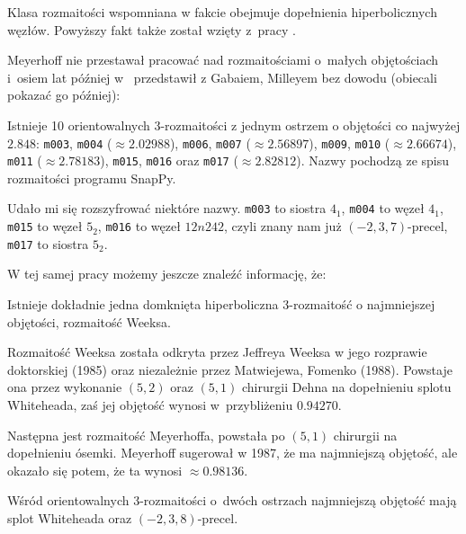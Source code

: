 Klasa rozmaitości wspomniana w fakcie obejmuje dopełnienia hiperbolicznych węzłów.
Powyższy fakt także został wzięty z~pracy \cite{cao01}.

Meyerhoff nie przestawał pracować nad rozmaitościami o~małych objętościach i~osiem lat później w~\cite{meyerhoff09} przedstawił z Gabaiem, Milleyem bez dowodu (obiecali pokazać go później):

\begin{proposition}
    Istnieje 10 orientowalnych 3-rozmaitości z jednym ostrzem o objętości co najwyżej $2.848$: \texttt{m003}, \texttt{m004} ($\approx 2.02988$), \texttt{m006}, \texttt{m007} ($\approx 2.56897$), \texttt{m009}, \texttt{m010} ($\approx 2.66674$), \texttt{m011} ($\approx 2.78183$), \texttt{m015}, \texttt{m016} oraz \texttt{m017} ($\approx 2.82812$).
    Nazwy pochodzą ze spisu rozmaitości programu SnapPy.
\end{proposition}

Udało mi się rozszyfrować niektóre nazwy.
\texttt{m003} to siostra $4_1$, %
\texttt{m004} to węzeł $4_1$, %
\texttt{m015} to węzeł $5_2$,
\texttt{m016} to węzeł $12n242$, czyli znany nam już $(-2, 3, 7)$-precel,
%
\texttt{m017} to siostra $5_2$. %

W tej samej pracy możemy jeszcze znaleźć informację, że:

\begin{proposition}
    Istnieje dokładnie jedna domknięta hiperboliczna 3-rozmaitość o najmniejszej objętości, rozmaitość Weeksa.
\end{proposition}

Rozmaitość Weeksa została odkryta przez Jeffreya Weeksa w jego rozprawie doktorskiej (1985) oraz niezależnie przez Matwiejewa, Fomenko (1988).
Powstaje ona przez wykonanie $(5, 2)$ oraz $(5, 1)$ chirurgii Dehna na dopełnieniu splotu Whiteheada, zaś jej objętość wynosi w~przybliżeniu $0.94270$. %

Następna jest rozmaitość Meyerhoffa, powstała po $(5, 1)$ chirurgii na dopełnieniu ósemki.
Meyerhoff sugerował w 1987, że ma najmniejszą objętość, ale okazało się potem, że ta wynosi $\approx 0.98136$.

\begin{proposition}
    Wśród orientowalnych 3-rozmaitości o~dwóch ostrzach najmniejszą objętość mają splot Whiteheada oraz $(-2, 3, 8)$-precel.
%
%
\end{proposition}

